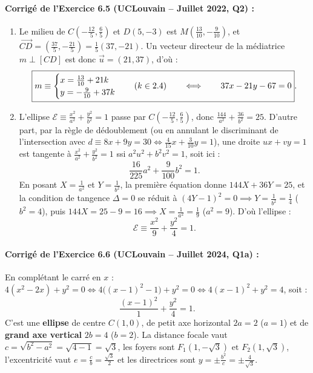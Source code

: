 \paragraph{Corrigé de l'Exercice 6.5 (UCLouvain -- Juillet 2022, Q2) :}
\begin{enumerate}[label=(\alph*)]
    \item Le milieu de $C\left(-\frac{12}{5}, \frac{6}{5}\right)$ et $D(5, -3)$ est $M\left(\frac{13}{10}, -\frac{9}{10}\right)$, et $\overrightarrow{CD} = \left(\frac{37}{5}, -\frac{21}{5}\right) = \frac{1}{5}(37, -21)$. Un vecteur directeur de la médiatrice $m \perp [CD]$ est donc $\vec{u} = (21, 37)$, d'où :
    \[
        \boxed{m \equiv \begin{cases} x = \frac{13}{10} + 21k \\ y = -\frac{9}{10} + 37k \end{cases} \quad (k \in 2.4) \qquad \Longleftrightarrow \qquad 37x - 21y - 67 = 0}.
    \]
    \item L'ellipse $\mathcal{E} \equiv \frac{x^2}{a^2} + \frac{y^2}{b^2} = 1$ passe par $C\left(-\frac{12}{5}, \frac{6}{5}\right)$, donc $\frac{144}{a^2} + \frac{36}{b^2} = 25$. D'autre part, par la règle de dédoublement (ou en annulant le discriminant de l'intersection avec $d \equiv 8x + 9y = 30 \iff \frac{4}{15}x + \frac{3}{10}y = 1$), une droite $ux + vy = 1$ est tangente à $\frac{x^2}{a^2} + \frac{y^2}{b^2} = 1$ ssi $a^2 u^2 + b^2 v^2 = 1$, soit ici :
    \[
        \frac{16}{225}a^2 + \frac{9}{100}b^2 = 1.
    \]
    En posant $X = \frac{1}{a^2}$ et $Y = \frac{1}{b^2}$, la première équation donne $144X + 36Y = 25$, et la condition de tangence $\Delta = 0$ se réduit à $(4Y - 1)^2 = 0 \implies Y = \frac{1}{b^2} = \frac{1}{4}$ ($b^2 = 4$), puis $144X = 25 - 9 = 16 \implies X = \frac{1}{a^2} = \frac{1}{9}$ ($a^2 = 9$). D'où l'ellipse :
    \[
        \boxed{\mathcal{E} \equiv \frac{x^2}{9} + \frac{y^2}{4} = 1}.
    \]
\end{enumerate}

\paragraph{Corrigé de l'Exercice 6.6 (UCLouvain -- Juillet 2024, Q1a) :}
En complétant le carré en $x$ : $4(x^2 - 2x) + y^2 = 0 \iff 4\bigl((x-1)^2 - 1\bigr) + y^2 = 0 \iff 4(x-1)^2 + y^2 = 4$, soit :
\[
    \boxed{\frac{(x-1)^2}{1} + \frac{y^2}{4} = 1}.
\]
C'est une \textbf{ellipse} de centre $C(1, 0)$, de petit axe horizontal $2a = 2$ ($a=1$) et de \textbf{grand axe vertical} $2b = 4$ ($b=2$). La distance focale vaut $c = \sqrt{b^2 - a^2} = \sqrt{4-1} = \sqrt{3}$, les foyers sont $\boxed{F_1(1, -\sqrt{3}) \text{ et } F_2(1, \sqrt{3})}$, l'excentricité vaut $e = \frac{c}{b} = \frac{\sqrt{3}}{2}$ et les directrices sont $y = \pm \frac{b^2}{c} = \pm \frac{4}{\sqrt{3}}$.

